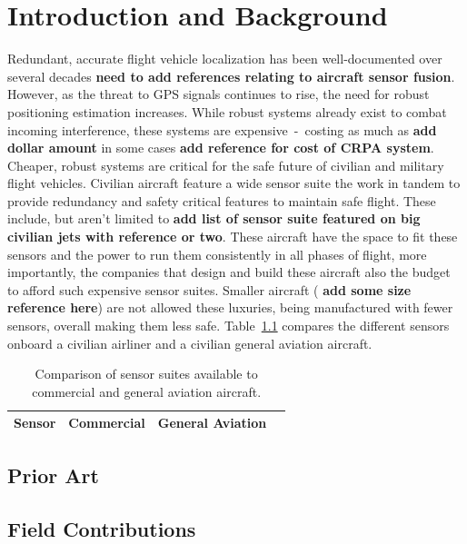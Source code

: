 \documentclass[12pt]{report}
\begin{document}
\normalem{}

\chapter{Introduction and Background}
Redundant, accurate flight vehicle localization has been well-documented over several decades \textbf{\color{red} need to add references relating to aircraft sensor fusion}. However, as the threat to GPS signals continues to rise, the need for robust positioning estimation increases. While robust systems already exist to combat incoming interference, these systems are expensive~-~costing as much as \textbf{\color{red} add dollar amount} in some cases \textbf{\color{red} add reference for cost of CRPA system}. Cheaper, robust systems are critical for the safe future of civilian and military flight vehicles. Civilian aircraft feature a wide sensor suite the work in tandem to provide redundancy and safety critical features to maintain safe flight. These include, but aren't limited to \textbf{\color{red} add list of sensor suite featured on big civilian jets with reference or two}. These aircraft have the space to fit these sensors and the power to run them consistently in all phases of flight, more importantly, the companies that design and build these aircraft also the budget to afford such expensive sensor suites. Smaller aircraft (\textbf{\color{red} add some size reference here}) are not allowed these luxuries, being manufactured with fewer sensors, overall making them less safe. Table~\ref{tbl:sensorsuitecomparison} compares the different sensors onboard a civilian airliner and a civilian general aviation aircraft.
\begin{table}[!ht]\label{tbl:sensorsuitecomparison}
  \caption{Comparison of sensor suites available to commercial and general aviation aircraft.}
  \centering
  \begin{tabular}{cccc}
    \toprule
    Sensor & Commercial & General Aviation \\
    \midrule
    \bottomrule
  \end{tabular}
\end{table}

\section{Prior Art}

\section{Field Contributions}
\end{document}
